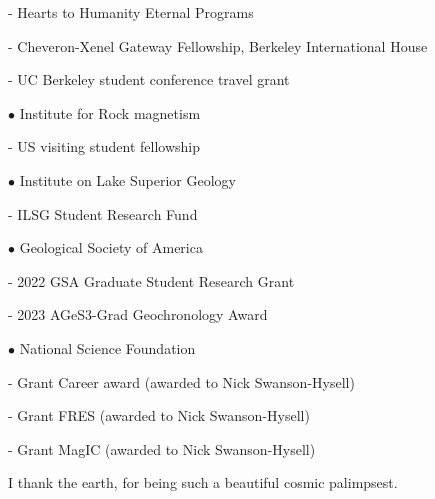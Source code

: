 \documentclass{ucbthesis}
\begin{document}
\begin{frontmatter}
\begin{acknowledgements}
    \hspace{\parindent} - Hearts to Humanity Eternal Programs
    \vspace{5mm}
    
    \hspace{\parindent} - Cheveron-Xenel Gateway Fellowship, Berkeley International House
    \vspace{5mm}
    
    \hspace{\parindent} - UC Berkeley student conference travel grant
\vspace{5mm}

$\bullet$ Institute for Rock magnetism
    \vspace{5mm}
    
    \hspace{\parindent} - US visiting student fellowship
    \vspace{5mm}
    
$\bullet$ Institute on Lake Superior Geology
    \vspace{5mm}
    
    \hspace{\parindent} - ILSG Student Research Fund
    \vspace{5mm}
    
$\bullet$ Geological Society of America
    \vspace{5mm}
    
    \hspace{\parindent} - 2022 GSA Graduate Student Research Grant 
    \vspace{5mm}
    
    \hspace{\parindent} - 2023 AGeS3-Grad Geochronology Award
    \vspace{5mm}
    
$\bullet$ National Science Foundation
    \vspace{5mm}

    \hspace{\parindent} - Grant Career award  (awarded to Nick Swanson-Hysell)
    \vspace{5mm}
    
    \hspace{\parindent} - Grant FRES  (awarded to Nick Swanson-Hysell)
    \vspace{5mm}
    
    \hspace{\parindent} - Grant MagIC  (awarded to Nick Swanson-Hysell)
    \vspace{15mm}
    
I thank the earth, for being such a beautiful cosmic palimpsest. 

\end{acknowledgements}

\end{frontmatter}
\end{document}
